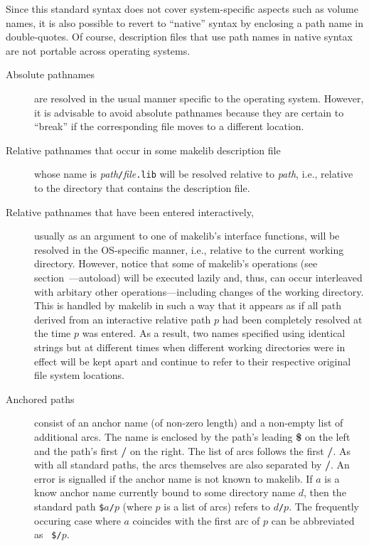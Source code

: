 Since this standard syntax does not cover system-specific aspects such
as volume names, it is also possible to revert to ``native'' syntax by
enclosing a path name in double-quotes.  Of course, description files
that use path names in native syntax are not portable across operating
systems.

\begin{description}
\item[Absolute pathnames] are resolved in the usual manner
specific to the operating system.  However, it is advisable to avoid
absolute pathnames because they are certain to ``break'' if the
corresponding file moves to a different location.
\item[Relative pathnames that occur in some makelib description file] whose
name is {\it path}{\tt /}{\it file}{\tt .lib} will be resolved relative
to {\it path}, i.e., relative to the directory that contains the
description file.
\item[Relative pathnames that have been entered interactively,]
usually as an argument to one of makelib's interface functions, will be
resolved in the OS-specific manner, i.e., relative to the current
working directory.  However, notice that some of makelib's operations (see
section~---autoload) will be executed lazily and,
thus, can occur interleaved with arbitary other operations---including
changes of the working directory.  This is handled by makelib in such a way
that it appears as if all path derived from an interactive relative
path $p$ had been completely resolved at the time $p$ was entered. As
a result, two names specified using identical strings but at different
times when different working directories were in effect will be kept
apart and continue to refer to their respective original file system
locations.
\item[Anchored paths] consist of an anchor name (of non-zero length)
and a non-empty list of additional arcs.  The name is enclosed by
the path's leading {\bf \$} on the left and the path's first {\bf /}
on the right.  The list of arcs follows the first {\bf /}.  As with
all standard paths, the arcs themselves are also separated by {\bf /}.
An error is signalled if the anchor name is not known to makelib.
If $a$ is a know anchor name currently bound to some directory name
$d$, then the standard path {\tt \$}$a${\tt /}$p$ (where $p$ is a list
of arcs) refers to $d${\tt /}$p$.  The frequently occuring case where
$a$ coincides with the first arc of $p$ can be abbreviated as {\tt
\$/}$p$.
\end{description}

